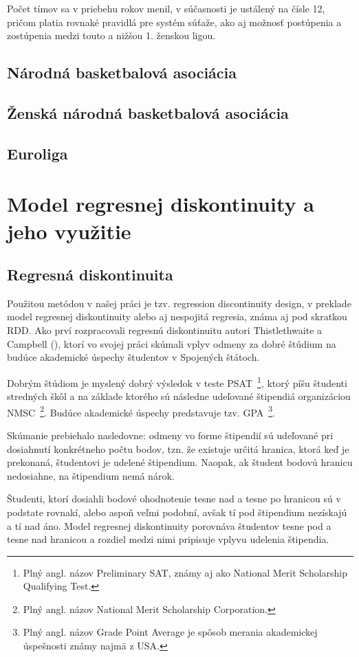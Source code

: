 \documentclass[
  digital, %
  oneside, %
  notable,   %
  lof,     %
  lot,     %
]{fithesis3}
\begin{document}
		Počet tímov sa v priebehu rokov menil, v súčasnosti je ustálený na čísle 12, pričom platia rovnaké pravidlá pre systém súťaže, ako aj možnosť postúpenia a zostúpenia medzi touto a nižšou 1. ženskou ligou.
		
		\section{Národná basketbalová asociácia}
		\section{Ženská národná basketbalová asociácia}
		\section{Euroliga}
	
	\chapter{Model regresnej diskontinuity a jeho využitie}
		\section{Regresná diskontinuita}
		Použitou metódou v našej práci je tzv. regression discontinuity design, v preklade model regresnej diskontinuity alebo aj nespojitá regresia, známa aj pod skratkou RDD. Ako prví rozpracovali regresnú diskontinuitu autori Thistlethwaite a Campbell (\citeyear{thist1960}), ktorí vo svojej práci skúmali vplyv odmeny za dobré štúdium na budúce akademické úspechy študentov v Spojených štátoch. 
		
		Dobrým štúdiom je myslený dobrý výsledok v teste PSAT~\footnote{Plný angl. názov Preliminary SAT, známy aj ako National Merit Scholarship Qualifying Test.}, ktorý píšu študenti stredných škôl a na základe ktorého sú následne udeľované štipendiá organizáciou NMSC~\footnote{Plný angl. názov National Merit Scholarship Corporation.}. Budúce akademické úspechy predstavuje tzv. GPA~\footnote{Plný angl. názov Grade Point Average je spôsob merania akademickej úspešnosti známy najmä z USA.}.
	
		Skúmanie prebiehalo nasledovne: odmeny vo forme štipendií sú udeľované pri dosiahnutí konkrétneho počtu bodov, tzn. že existuje určitá hranica, ktorá keď je prekonaná, študentovi je udelené štipendium. Naopak, ak študent bodovú hranicu nedosiahne, na štipendium nemá nárok. 
	
		Študenti, ktorí dosiahli bodové ohodnotenie tesne nad a tesne po hranicou sú v podstate rovnakí, alebo aspoň veľmi podobní, avšak tí pod štipendium nezískajú a tí nad áno. Model regresnej diskontinuity porovnáva študentov tesne pod a tesne nad hranicou a rozdiel medzi nimi pripisuje vplyvu udelenia štipendia. 
	
\end{document}
